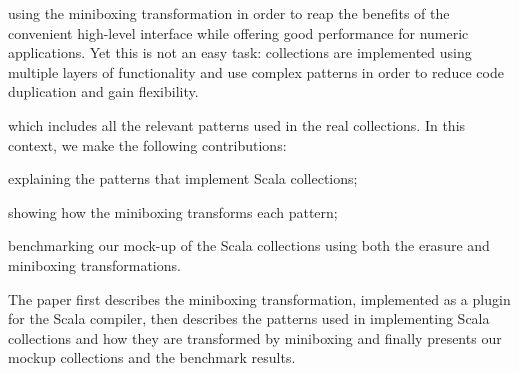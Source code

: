  using the miniboxing transformation in order to reap the benefits of the convenient high-level interface while offering good performance for numeric applications. Yet this is not an easy task: collections are implemented using multiple layers of functionality and use complex patterns in order to reduce code duplication and gain flexibility.

 which includes all the relevant patterns used in the real collections. In this context, we make the following contributions:

\begin{packed_item}
\item explaining the patterns that implement Scala collections;
\item showing how the miniboxing transforms each pattern;
\item benchmarking our mock-up of the Scala collections using both the erasure and miniboxing transformations.
\end{packed_item}

The paper first describes the miniboxing transformation, implemented as a plugin for the Scala compiler, then describes the patterns used in implementing Scala collections and how they are transformed by miniboxing and finally presents our mockup collections and the benchmark results.